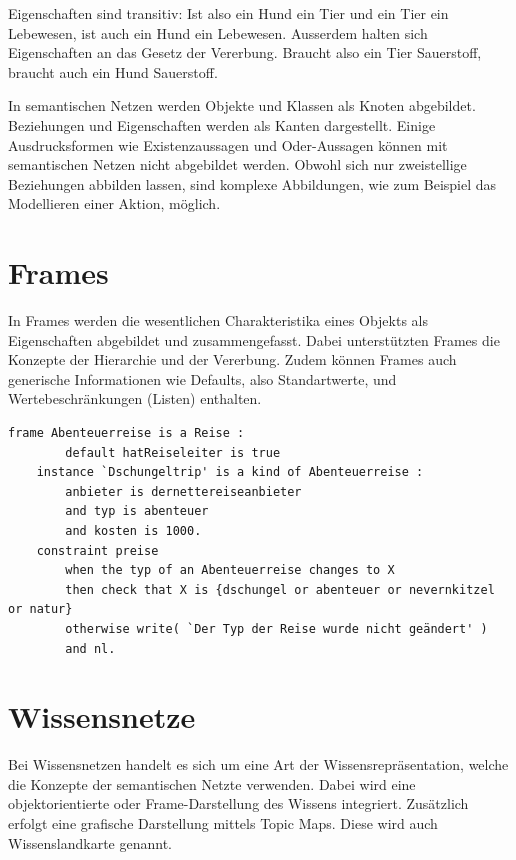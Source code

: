 Eigenschaften sind transitiv: Ist also ein Hund ein Tier und ein Tier ein Lebewesen, ist auch ein Hund ein Lebewesen. Ausserdem halten sich Eigenschaften an das Gesetz der Vererbung. Braucht also ein Tier Sauerstoff, braucht auch ein Hund Sauerstoff.

In semantischen Netzen werden Objekte und Klassen als Knoten abgebildet. Beziehungen und Eigenschaften werden als Kanten dargestellt.
Einige Ausdrucksformen wie Existenzaussagen und Oder-Aussagen können mit semantischen Netzen nicht abgebildet werden. Obwohl sich nur zweistellige Beziehungen abbilden lassen, sind komplexe Abbildungen, wie zum Beispiel das Modellieren einer Aktion, möglich.

\section{Frames}
\label{sec:wissensrepFormen_frames}

In Frames werden die wesentlichen Charakteristika eines Objekts als Eigenschaften abgebildet und zusammengefasst. Dabei unterstützten Frames die Konzepte der Hierarchie und der Vererbung. Zudem können Frames auch generische Informationen wie Defaults, also Standartwerte, und Wertebeschränkungen (Listen) enthalten.

\begin{lstlisting}[caption={Beispiel eines Frames anhand einer Reise.}]
    frame Abenteuerreise is a Reise :
        default hatReiseleiter is true
    instance `Dschungeltrip' is a kind of Abenteuerreise :
        anbieter is dernettereiseanbieter
        and typ is abenteuer
        and kosten is 1000.
    constraint preise
        when the typ of an Abenteuerreise changes to X
        then check that X is {dschungel or abenteuer or nevernkitzel or natur}
        otherwise write( `Der Typ der Reise wurde nicht geändert' )
        and nl.
\end{lstlisting}

\section{Wissensnetze}
\label{sec:wissensrepFormen_Wissensnetze}
Bei Wissensnetzen handelt es sich um eine Art der Wissensrepräsentation, welche die Konzepte der semantischen Netzte verwenden. Dabei wird eine objektorientierte oder Frame-Darstellung des Wissens integriert. Zusätzlich erfolgt eine grafische Darstellung mittels Topic Maps. Diese wird auch Wissenslandkarte genannt. 

